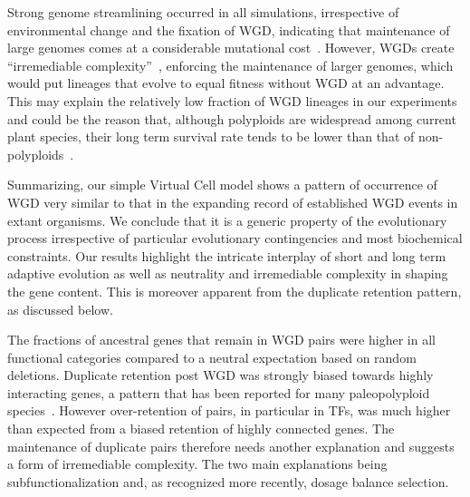 Strong genome streamlining occurred in all simulations, irrespective of environmental change and the fixation of WGD, indicating that maintenance of large genomes comes at a considerable mutational cost~\cite{otto_evolutionary_2007,cuypers_virtual_2012,yona_chromosomal_2012}. However, WGDs create ``irremediable complexity''~\cite{lynch_origins_2006,freeling_bias_2009,gray_irremediable_2010}, enforcing the maintenance of larger genomes, which would put lineages that evolve to equal fitness without WGD at an advantage. This may explain the relatively low fraction of WGD lineages in our experiments and could be the reason that, although polyploids are widespread among current plant species, their long term survival rate tends to be lower than that of non-polyploids~\cite{mayrose_recently_2011}.

Summarizing, our simple Virtual Cell model shows a pattern of occurrence of WGD very similar to that in the expanding record of established WGD events in extant organisms. We conclude that it is a generic property of the evolutionary process irrespective of particular evolutionary contingencies and most biochemical constraints. Our results highlight the intricate interplay of short and long term adaptive evolution as well as neutrality and irremediable complexity in shaping the gene content. This is moreover apparent from the duplicate retention pattern, as discussed below.

The fractions of ancestral genes that remain in WGD pairs were higher in all functional categories compared to a neutral expectation based on random deletions. Duplicate retention post WGD was strongly biased towards highly interacting genes, a pattern that has been reported for many paleopolyploid species~\cite{blanc_functional_2004,maere_modeling_2005,aury_global_2006,freeling_bias_2009,huminiecki_2r_2010,rodgers-melnick_contrasting_2012,schnable_escape_2012}. However over-retention of pairs, in particular in TFs, was much higher than expected from a biased retention of highly connected genes. The maintenance of duplicate pairs therefore needs another explanation and suggests a form of irremediable complexity. The two main explanations being subfunctionalization and, as recognized more recently, dosage balance selection. 

